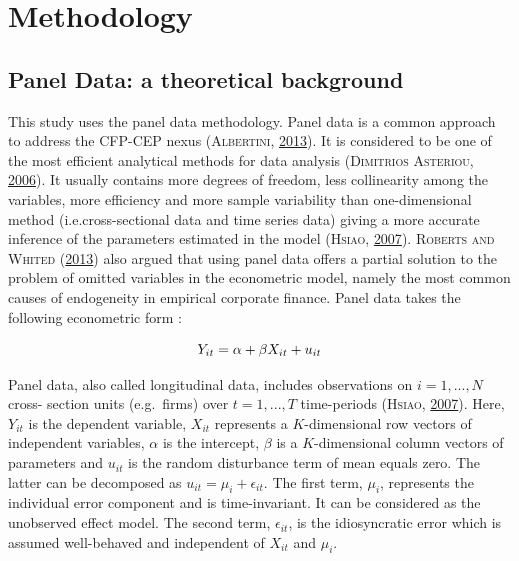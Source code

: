 \documentclass[12pt,]{article}
\begin{document}
\FloatBarrier
\newpage
{}

\section{Methodology}\label{Methodology}

\subsection{Panel Data: a theoretical
background}\label{panel-data-a-theoretical-background}

This study uses the panel data methodology. Panel data is a common
approach to address the CFP-CEP nexus (\textsc{Albertini},
\protect\hyperlink{ref-Albertini2013}{2013}). It is considered to be one
of the most efficient analytical methods for data analysis
(\textsc{Dimitrios Asteriou},
\protect\hyperlink{ref-DimitriosAsteriou2006}{2006}). It usually
contains more degrees of freedom, less collinearity among the variables,
more efficiency and more sample variability than one-dimensional method
(i.e.cross-sectional data and time series data) giving a more accurate
inference of the parameters estimated in the model (\textsc{Hsiao},
\protect\hyperlink{ref-Hsiao2007}{2007}). \textsc{Roberts and Whited}
(\protect\hyperlink{ref-Roberts2013}{2013}) also argued that using panel
data offers a partial solution to the problem of omitted variables in
the econometric model, namely the most common causes of endogeneity in
empirical corporate finance. Panel data takes the following econometric
form :

\begin{equation}
\centering
Y_{it} = \alpha + \beta X_{it} + u_{it} 
\label{PanelData}
\end{equation}

Panel data, also called longitudinal data, includes observations on
\(i = 1,..., N\) cross- section units (e.g.~firms) over \(t = 1,..., T\)
time-periods (\textsc{Hsiao}, \protect\hyperlink{ref-Hsiao2007}{2007}).
Here, \(Y_{it}\) is the dependent variable, \(X_{it}\) represents a
\(K\)-dimensional row vectors of independent variables, \(\alpha\) is
the intercept, \(\beta\) is a \(K\)-dimensional column vectors of
parameters and \(u_{it}\) is the random disturbance term of mean equals
zero. The latter can be decomposed as
\(u_{it} = \mu_{i} + \epsilon_{it}\). The first term, \(\mu_{i}\),
represents the individual error component and is time-invariant. It can
be considered as the unobserved effect model. The second term,
\(\epsilon_{it}\), is the idiosyncratic error which is assumed
well-behaved and independent of \(X_{it}\) and \(\mu_{i}\).
\end{document}

